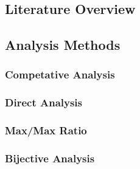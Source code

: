 \subsection{Literature Overview}
\label{sec:lit}

\subsection{Analysis Methods}
\label{sec:AM}

\subsubsection*{Competative Analysis}
\label{sec:Comp}

\subsubsection*{Direct Analysis}
\label{sec:Direct}

\subsubsection*{Max/Max Ratio}
\label{sec:MaxMax}

\subsubsection*{Bijective Analysis}
\label{sec:Bij}